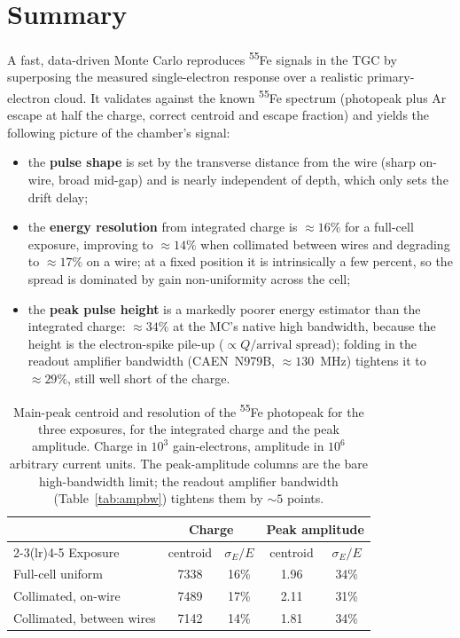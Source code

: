 \documentclass[11pt,a4paper]{article}
\newcommand{\Fe}{\textsuperscript{55}Fe}
\begin{document}
\section{Summary}
A fast, data-driven Monte Carlo reproduces \Fe{} signals in the TGC by superposing the measured
single-electron response over a realistic primary-electron cloud. It validates against the known \Fe{}
spectrum (photopeak plus Ar escape at half the charge, correct centroid and escape fraction) and yields
the following picture of the chamber's signal:
\begin{itemize}
  \item the \textbf{pulse shape} is set by the transverse distance from the wire (sharp on-wire, broad
        mid-gap) and is nearly independent of depth, which only sets the drift delay;
  \item the \textbf{energy resolution} from integrated charge is $\approx16\%$ for a full-cell
        exposure, improving to $\approx14\%$ when collimated between wires and degrading to $\approx17\%$
        on a wire; at a fixed position it is intrinsically a few percent, so the spread is dominated by
        gain non-uniformity across the cell;
  \item the \textbf{peak pulse height} is a markedly poorer energy estimator than the integrated charge:
        $\approx34\%$ at the MC's native high bandwidth, because the height is the electron-spike
        pile-up ($\propto Q/\text{arrival spread}$); folding in the readout amplifier bandwidth
        (CAEN~N979B, $\approx130$~MHz) tightens it to $\approx29\%$, still well short of the charge.
\end{itemize}

\begin{table}[htbp]
  \centering
  \caption{Main-peak centroid and resolution of the \Fe{} photopeak for the three exposures, for the
  integrated charge and the peak amplitude. Charge in $10^3$ gain-electrons, amplitude in $10^6$
  arbitrary current units. The peak-amplitude columns are the bare high-bandwidth limit; the readout
  amplifier bandwidth (Table~\ref{tab:ampbw}) tightens them by ${\sim}5$ points.}
  \label{tab:summary}
  \begin{tabular}{lcccc}
    \toprule
    & \multicolumn{2}{c}{Charge} & \multicolumn{2}{c}{Peak amplitude} \\
    \cmidrule(lr){2-3}\cmidrule(lr){4-5}
    Exposure & centroid & $\sigma_E/E$ & centroid & $\sigma_E/E$ \\
    \midrule
    Full-cell uniform        & 7338 & 16\% & 1.96 & 34\% \\
    Collimated, on-wire      & 7489 & 17\% & 2.11 & 31\% \\
    Collimated, between wires & 7142 & 14\% & 1.81 & 34\% \\
    \bottomrule
  \end{tabular}
\end{table}
\end{document}

